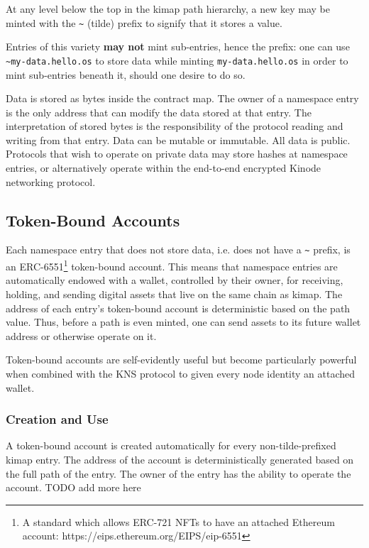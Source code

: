 \documentclass[runningheads]{llncs}
\begin{document}
At any level below the top in the kimap path hierarchy, a new key may be minted with the \verb|~| (tilde) prefix to signify that it stores a value.

Entries of this variety \textbf{may not} mint sub-entries, hence the prefix: one can use \verb|~my-data.hello.os| to store data while minting \verb|my-data.hello.os| in order to mint sub-entries beneath it, should one desire to do so.

Data is stored as bytes inside the contract map.
The owner of a namespace entry is the only address that can modify the data stored at that entry.
The interpretation of stored bytes is the responsibility of the protocol reading and writing from that entry.
Data can be mutable or immutable.
All data is public.
Protocols that wish to operate on private data may store hashes at namespace entries, or alternatively operate within the end-to-end encrypted Kinode networking protocol.

\subsection{Token-Bound Accounts}

Each namespace entry that does not store data, i.e. does not have a \verb|~| prefix, is an ERC-6551\footnote{A standard which allows ERC-721 NFTs to have an attached Ethereum account:  https://eips.ethereum.org/EIPS/eip-6551} token-bound account.
This means that namespace entries are automatically endowed with a wallet, controlled by their owner, for receiving, holding, and sending digital assets that live on the same chain as kimap.
The address of each entry's token-bound account is deterministic based on the path value.
Thus, before a path is even minted, one can send assets to its future wallet address or otherwise operate on it.

Token-bound accounts are self-evidently useful but become particularly powerful when combined with the KNS protocol to given every node identity an attached wallet.

\subsubsection{Creation and Use}

A token-bound account is created automatically for every non-tilde-prefixed kimap entry.
The address of the account is deterministically generated based on the full path of the entry.
The owner of the entry has the ability to operate the account.
TODO add more here
\end{document}
